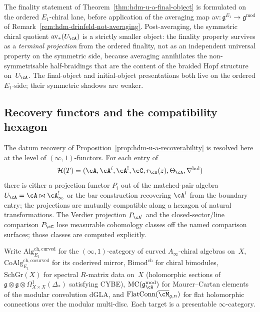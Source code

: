 \begin{remark}
\label{rem:hdm-u-a-final-pre-averaging}
The finality statement of Theorem~\ref{thm:hdm-u-a-final-object} is
formulated on the ordered $E_1$-chiral lane, before application of the
averaging map $\mathrm{av}\colon\mathfrak g^{E_1}\to\mathfrak
g^{\mathrm{mod}}$ of Remark~\ref{rem:hdm-drinfeld-not-averaging}.
Post-averaging, the symmetric chiral quotient
$\mathrm{av}_*(U_\cA)$ is a strictly smaller object: the finality
property survives as a \emph{terminal projection} from the ordered
finality, not as an independent universal property on the symmetric
side, because averaging annihilates the non-symmetrisable half-braidings
that are the content of the braided Hopf structure on~$U_\cA$. The
final-object and initial-object presentations both live on the ordered
$E_1$-side; their symmetric shadows are weaker.
\end{remark}

\subsection{Recovery functors and the compatibility hexagon}
\label{subsec:hdm-recovery-functors}

The datum recovery of
Proposition~\ref{prop:hdm-u-a-recoverability} is resolved here at the
level of $(\infty,1)$-functors. For each entry of
\[
\mathcal H(T)
=
(\cA,\cA^i,\cA^!,\cC,r_\cA(z),\Theta_\cA,\nabla^{\mathrm{hol}})
\]
there is either a projection functor $P_i$ out of the matched-pair
algebra $U_\cA=\cA\bowtie\cA^!_\infty$ or the bar construction
recovering $\cA^i$ from the boundary entry; the projections are
mutually compatible along a hexagon of natural transformations. The Verdier
projection $P_{\cA^!}$ and the closed-sector/line comparison $P_\cC$ lose
measurable cohomology classes off the named comparison surfaces; those
classes are computed explicitly.

Write $\mathrm{Alg}_{E_1}^{\mathrm{ch,curved}}$ for the
$(\infty,1)$-category of curved $A_\infty$-chiral algebras on~$X$,
$\mathrm{CoAlg}_{E_1}^{\mathrm{ch,cocurved}}$ for its coderived mirror,
$\mathrm{Bimod}^{\mathrm{ch}}$ for chiral bimodules,
$\mathrm{SchGr}(X)$ for spectral $R$-matrix data on~$X$
(holomorphic sections of
$\mathfrak g\otimes\mathfrak g\otimes \Omega^1_{X\times X}(\Delta_*)$
satisfying CYBE), $\mathrm{MC}(\mathfrak g^{\mathrm{mod}}_\cA)$ for
Maurer--Cartan elements of the modular convolution dGLA, and
$\mathrm{FlatConn}(\overline{\cM}_{g,n})$ for flat
holomorphic connections over the modular multi-disc. Each target is a
presentable $\infty$-category.

